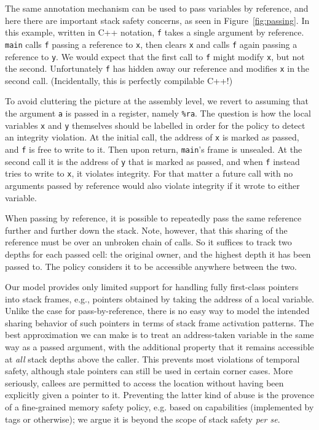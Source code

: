 \documentclass[acmsmall,review,anonymous]{acmart}\settopmatter{printfolios=true,printccs=false,printacmref=false}
\begin{document}
The same annotation mechanism can be used to pass
variables by reference, and here there are important stack safety concerns,
as seen in Figure~\ref{fig:passing}. In this example, written in C++ notation,
{\tt f} takes a single argument by reference.
{\tt main} calls {\tt f} passing a reference to {\tt x}, then clears {\tt x} and calls
{\tt f} again passing a reference to {\tt y}.
We would expect that the first call to {\tt f} might modify
{\tt x}, but not the second. Unfortunately {\tt f} has hidden away our reference and modifies
{\tt x} in the second call. (Incidentally, this is perfectly compilable C++!)

To avoid cluttering the picture at the assembly level, we revert to assuming that the
argument {\tt a} is passed in a register, namely {\tt \%ra}.
The question is how the local variables {\tt x} and {\tt y} themselves
should be labelled in order for the policy to detect an integrity violation.
At the initial call, the address of {\tt x} is marked as passed, and {\tt f} is free to write to it. Then upon
return, {\tt main}'s frame is unsealed. At the second call it is the address of {\tt y} that is marked as passed,
and when {\tt f} instead tries to write to {\tt x}, it violates integrity. For that matter
a future call with no arguments passed by reference would also violate integrity if it wrote
to either variable.

When passing by reference, it is possible to repeatedly pass the same reference further
and further down the stack. Note, however, that this sharing of the reference must be over
an unbroken chain of calls. So it suffices to track two depths for each passed
cell: the original owner, and the highest depth it has been passed to. The policy considers
it to be accessible anywhere between the two.

Our model provides only limited support for handling fully first-class pointers into
stack frames, e.g., pointers obtained by taking the address of a local variable.
Unlike the case for pass-by-reference, there is no easy way to model the intended
sharing behavior of such pointers in terms of stack frame activation patterns.
The best approximation we can make is to treat an address-taken variable in the
same way as a passed argument, with the additional property
that it remains accessible at \emph{all} stack depths above the caller.
This prevents most violations of temporal safety, although stale pointers can still be
used in certain corner cases.
More seriously, callees are permitted to access the location without having
been explicitly given a pointer to it.  Preventing the latter kind of abuse
is the provence of a fine-grained memory safety policy, e.g. based on capabilities
(implemented by tags or otherwise); we argue it is beyond the scope of stack safety
\emph{per se}.
\end{document}

